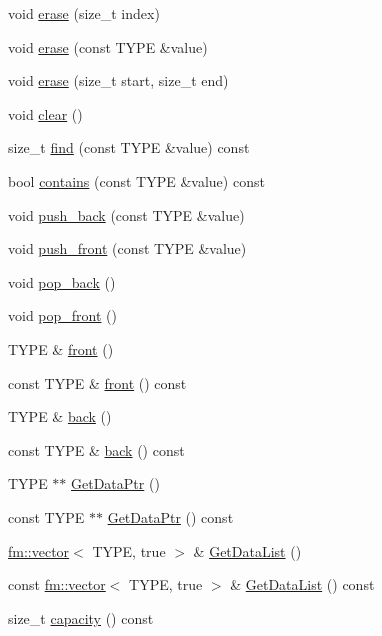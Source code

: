 \begin{DoxyCompactItemize}
\item 
void \hyperlink{classFCDParameterListAnimatableT_aab32b0a366249c6730b68c6e463fc6f0}{erase} (size\_\-t index)
\item 
void \hyperlink{classFCDParameterListAnimatableT_ae5c50370512e97de76a8bfdb1e84ec0b}{erase} (const TYPE \&value)
\item 
void \hyperlink{classFCDParameterListAnimatableT_a27389c75812a668ffa279a7048506c16}{erase} (size\_\-t start, size\_\-t end)
\item 
void \hyperlink{classFCDParameterListAnimatableT_a2476ccf7c86a6addd52c1f354f8a03f1}{clear} ()
\item 
size\_\-t \hyperlink{classFCDParameterListAnimatableT_aa97ba0283cc76be31d9969204038ee41}{find} (const TYPE \&value) const 
\item 
bool \hyperlink{classFCDParameterListAnimatableT_af0e10af58090581ed816c0e8326af21f}{contains} (const TYPE \&value) const 
\item 
void \hyperlink{classFCDParameterListAnimatableT_afed25c181c67da98e3b9db31b6f1edc7}{push\_\-back} (const TYPE \&value)
\item 
void \hyperlink{classFCDParameterListAnimatableT_a9158941c8900e9428c363735235bdec2}{push\_\-front} (const TYPE \&value)
\item 
void \hyperlink{classFCDParameterListAnimatableT_a5d3bc56ecdb5c60b7f0884a1f4d51e46}{pop\_\-back} ()
\item 
void \hyperlink{classFCDParameterListAnimatableT_af480fd99170eec5720efcbc1daecc544}{pop\_\-front} ()
\item 
TYPE \& \hyperlink{classFCDParameterListAnimatableT_a5e77a9881dbb6856a40959c0615fb44e}{front} ()
\item 
const TYPE \& \hyperlink{classFCDParameterListAnimatableT_a5c5eaeea684867c854529621bfa59f68}{front} () const 
\item 
TYPE \& \hyperlink{classFCDParameterListAnimatableT_afad7bd49a475b4d6f9e307fc817abd95}{back} ()
\item 
const TYPE \& \hyperlink{classFCDParameterListAnimatableT_a013b67ed4471cf351fb1a9bfd778ffa0}{back} () const 
\item 
TYPE $\ast$$\ast$ \hyperlink{classFCDParameterListAnimatableT_ae8033d46d76133b4c56e1d76c5fd9f0c}{GetDataPtr} ()
\item 
const TYPE $\ast$$\ast$ \hyperlink{classFCDParameterListAnimatableT_a461d7b626d8eb71b45d8f9d3530430b0}{GetDataPtr} () const 
\item 
\hyperlink{classfm_1_1vector}{fm::vector}$<$ TYPE, true $>$ \& \hyperlink{classFCDParameterListAnimatableT_a73e6181e1aa73fb84ad9107e5e943059}{GetDataList} ()
\item 
const \hyperlink{classfm_1_1vector}{fm::vector}$<$ TYPE, true $>$ \& \hyperlink{classFCDParameterListAnimatableT_a133c55a794a99b1f13652de9a637e3d9}{GetDataList} () const 
\item 
size\_\-t \hyperlink{classFCDParameterListAnimatableT_a5455ddc6c00d01a7261444a8eeee5ef6}{capacity} () const 
\end{DoxyCompactItemize}
